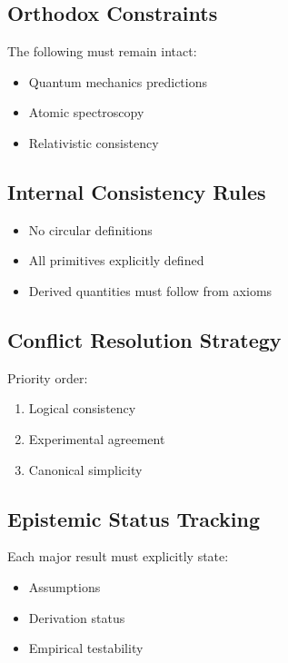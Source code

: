 \documentclass[11pt]{article}
\theoremstyle{definition}
\theoremstyle{plain}
\theoremstyle{remark}
\begin{document}
    \subsection{Orthodox Constraints}
        
        The following must remain intact:
        
        \begin{itemize}
            \item Quantum mechanics predictions
            \item Atomic spectroscopy
            \item Relativistic consistency
        \end{itemize}
    
    \subsection{Internal Consistency Rules}
        
        \begin{itemize}
            \item No circular definitions
            \item All primitives explicitly defined
            \item Derived quantities must follow from axioms
        \end{itemize}
    
    \subsection{Conflict Resolution Strategy}
        
        Priority order:
        
        \begin{enumerate}
            \item Logical consistency
            \item Experimental agreement
            \item Canonical simplicity
        \end{enumerate}
    
    \subsection{Epistemic Status Tracking}
        
        Each major result must explicitly state:
        
        \begin{itemize}
            \item Assumptions
            \item Derivation status
            \item Empirical testability
        \end{itemize}
\end{document}
